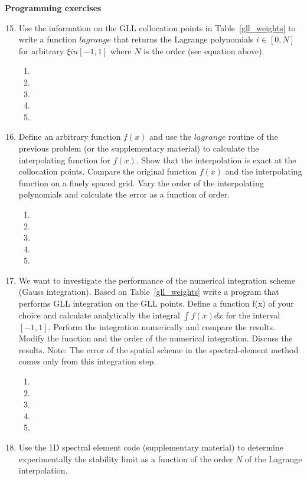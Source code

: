 {\bf Programming exercises}
\begin{enumerate}
\setcounter{enumi}{14}
\item
Use the information on the GLL collocation points in Table~\ref{gll_weights} to write a function $lagrange$ that returns the Lagrange polynomials $i \in[0, N]$ for arbitrary $\xi in [-1,1]$ where $N$ is the order (see equation above).
\begin{enumerate}
\item[]
\item[]
\item[] 
\item[]
\item[] 
\end{enumerate}
\item
Define an arbitrary function $f(x)$ and use the $lagrange$ routine  of the previous problem (or the supplementary material) to calculate the interpolating  function for $f(x)$. Show that the interpolation is exact at the collocation points. Compare the original function $f(x)$ and the interpolating function on a finely spaced grid. Vary the order of the interpolating polynomials and calculate the error as a function of order. 
\begin{enumerate}
\item[]
\item[]
\item[] 
\item[]
\item[] 
\end{enumerate}
\item
We want to investigate the performance of the numerical integration scheme (Gauss integration). Based on Table~\ref{gll_weights} write a program that performs GLL integration on the GLL points.  Define a function f(x) of your choice and calculate analytically the integral $\int f(x) dx$ for the interval $[-1,1]$. Perform the integration numerically and compare the results. Modify the function and the order of the numerical integration. Discuss the results. Note: The error of the spatial scheme in the spectral-element method comes only from this integration step. 
\begin{enumerate}
\item[]
\item[]
\item[] 
\item[]
\item[] 
\end{enumerate}
\item
Use the 1D spectral element code (supplementary material) to determine experimentally the stability limit as a function of the order $N$ of the Lagrange interpolation. 

\end{enumerate}
